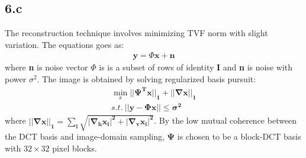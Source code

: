 \documentclass[12pt]{article}
\begin{document}
\subsection*{6.c}
The reconstruction technique involves minimizing TVF norm with slight variation. The equations goes as:
\begin{align*}
    \textbf{y} = \Phi\textbf{x}+\textbf{n}
\end{align*}
where \textbf{n} is noise vector $\Phi$ is is a subset of rows of identity \textbf{I} and \textbf{n} is noise with power $\sigma^2$.
The image is obtained by solving regularized basis pursuit:
\begin{align*}
    \min_{x} \boldsymbol{||\Psi^Tx||_1 + ||\nabla x||_1}\\
    s.t. \ \boldsymbol{||y - \Phi x|| \leq  \sigma^2}
\end{align*}
 where  $\boldsymbol{||\nabla x||_1 = \sum_i\sqrt{|\nabla_hx_i|^2+|\nabla_vx_i|^2}}$. By the low mutual coherence
between the DCT basis and image-domain sampling, $\boldsymbol{\Psi}$ is chosen to be a block-DCT basis  with $32 \times 32$ pixel blocks. 
\end{document}
